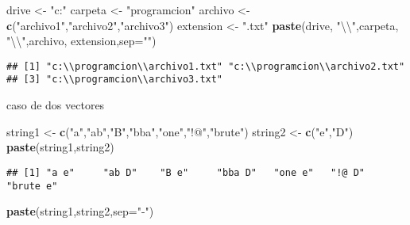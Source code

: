 \documentclass[]{article}
\newenvironment{Shaded}{\begin{snugshade}}{\end{snugshade}}
\newcommand{\KeywordTok}[1]{\textcolor[rgb]{0.13,0.29,0.53}{\textbf{#1}}}
\newcommand{\DataTypeTok}[1]{\textcolor[rgb]{0.13,0.29,0.53}{#1}}
\newcommand{\CharTok}[1]{\textcolor[rgb]{0.31,0.60,0.02}{#1}}
\newcommand{\StringTok}[1]{\textcolor[rgb]{0.31,0.60,0.02}{#1}}
\newcommand{\NormalTok}[1]{#1}
\begin{document}
\begin{Shaded}
\begin{Highlighting}[]
\NormalTok{drive <-}\StringTok{ "c:"}
\NormalTok{carpeta <-}\StringTok{ "programcion"}
\NormalTok{archivo <-}\StringTok{ }\KeywordTok{c}\NormalTok{(}\StringTok{"archivo1"}\NormalTok{,}\StringTok{"archivo2"}\NormalTok{,}\StringTok{"archivo3"}\NormalTok{)}
\NormalTok{extension <-}\StringTok{ ".txt"}
\KeywordTok{paste}\NormalTok{(drive, }\StringTok{"}\CharTok{\textbackslash{}\textbackslash{}}\StringTok{"}\NormalTok{,carpeta, }\StringTok{"}\CharTok{\textbackslash{}\textbackslash{}}\StringTok{"}\NormalTok{,archivo, extension,}\DataTypeTok{sep=}\StringTok{""}\NormalTok{)}
\end{Highlighting}
\end{Shaded}

\begin{verbatim}
## [1] "c:\\programcion\\archivo1.txt" "c:\\programcion\\archivo2.txt"
## [3] "c:\\programcion\\archivo3.txt"
\end{verbatim}

caso de dos vectores

\begin{Shaded}
\begin{Highlighting}[]
\NormalTok{string1 <-}\StringTok{ }\KeywordTok{c}\NormalTok{(}\StringTok{"a"}\NormalTok{,}\StringTok{"ab"}\NormalTok{,}\StringTok{"B"}\NormalTok{,}\StringTok{"bba"}\NormalTok{,}\StringTok{"one"}\NormalTok{,}\StringTok{"!@"}\NormalTok{,}\StringTok{"brute"}\NormalTok{)}
\NormalTok{string2 <-}\StringTok{ }\KeywordTok{c}\NormalTok{(}\StringTok{"e"}\NormalTok{,}\StringTok{"D"}\NormalTok{)}
\KeywordTok{paste}\NormalTok{(string1,string2)}
\end{Highlighting}
\end{Shaded}

\begin{verbatim}
## [1] "a e"     "ab D"    "B e"     "bba D"   "one e"   "!@ D"    "brute e"
\end{verbatim}

\begin{Shaded}
\begin{Highlighting}[]
\KeywordTok{paste}\NormalTok{(string1,string2,}\DataTypeTok{sep=}\StringTok{"-"}\NormalTok{)}
\end{Highlighting}
\end{Shaded}
\end{document}
